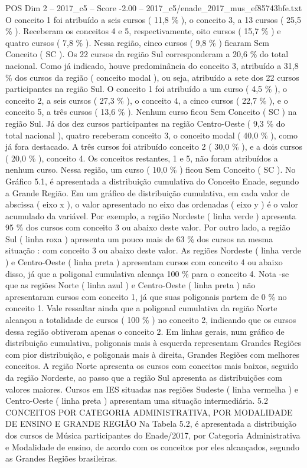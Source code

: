 \begin{textsample}{POS Dim 2 – 2017\_c5 – Score -2.00 – 2017\_c5/enade\_2017\_mus\_ef85743bfe.txt}
O conceito 1 foi atribuído a seis cursos ( 11,8 \% ), o conceito 3, a 13 cursos ( 25,5 \% ).
Receberam os conceitos 4 e 5, respectivamente, oito cursos ( 15,7 \% ) e quatro cursos ( 7,8 \% ).
Nessa região, cinco cursos ( 9,8 \% ) ficaram Sem Conceito ( SC ).
Os 22 cursos da região Sul corresponderam a 20,6 \% do total nacional.
Como já indicado, houve predominância do conceito 3, atribuído a 31,8 \% dos cursos da região ( conceito modal ), ou seja, atribuído a sete dos 22 cursos participantes na região Sul.
O conceito 1 foi atribuído a um curso ( 4,5 \% ), o conceito 2, a seis cursos ( 27,3 \% ), o conceito 4, a cinco cursos ( 22,7 \% ), e o conceito 5, a três cursos ( 13,6 \% ).
Nenhum curso ficou Sem Conceito ( SC ) na região Sul.
Já dos dez cursos participantes na região Centro-Oeste ( 9,3 \% do total nacional ), quatro receberam conceito 3, o conceito modal ( 40,0 \% ), como já fora destacado.
A três cursos foi atribuído conceito 2 ( 30,0 \% ), e a dois cursos ( 20,0 \% ), conceito 4.
Os conceitos restantes, 1 e 5, não foram atribuídos a nenhum curso.
Nessa região, um curso ( 10,0 \% ) ficou Sem Conceito ( SC ).
No Gráfico 5.1, é apresentada a distribuição cumulativa do Conceito Enade, segundo a Grande Região.
Em um gráfico de distribuição cumulativa, em cada valor de abscissa ( eixo x ), o valor apresentado no eixo das ordenadas ( eixo y ) é o valor acumulado da variável.
Por exemplo, a região Nordeste ( linha verde ) apresenta 95 \% dos cursos com conceito 3 ou abaixo deste valor.
Por outro lado, a região Sul ( linha roxa ) apresenta um pouco mais de 63 \% dos cursos na mesma situação : com conceito 3 ou abaixo deste valor.
As regiões Nordeste ( linha verde ) e Centro-Oeste ( linha preta ) apresentam cursos com conceito 4 ou abaixo disso, já que a poligonal cumulativa alcança 100 \% para o conceito 4.
Nota -se que as regiões Norte ( linha azul ) e Centro-Oeste ( linha preta ) não apresentaram cursos com conceito 1, já que suas poligonais partem de 0 \% no conceito 1.
Vale ressaltar ainda que a poligonal cumulativa da região Norte alcançou a totalidade de cursos ( 100 \% ) no conceito 2, indicando que os cursos dessa região obtiveram apenas o conceito 2.
Em linhas gerais, num gráfico de distribuição cumulativa, poligonais mais à esquerda representam Grandes Regiões com pior distribuição, e poligonais mais à direita, Grandes Regiões com melhores conceitos.
A região Norte apresenta os cursos com conceitos mais baixos, seguido da região Nordeste, ao passo que a região Sul apresenta as distribuições com valores maiores.
Cursos em IES situadas nas regiões Sudeste ( linha vermelha ) e Centro-Oeste ( linha preta ) apresentam uma situação intermediária. 5.2 CONCEITOS POR CATEGORIA ADMINISTRATIVA, POR MODALIDADE DE ENSINO E GRANDE REGIÃO Na Tabela 5.2, é apresentada a distribuição dos cursos de Música participantes do Enade/2017, por Categoria Administrativa e Modalidade de ensino, de acordo com os conceitos por eles alcançados, segundo as Grandes Regiões brasileiras.

\end{textsample}
